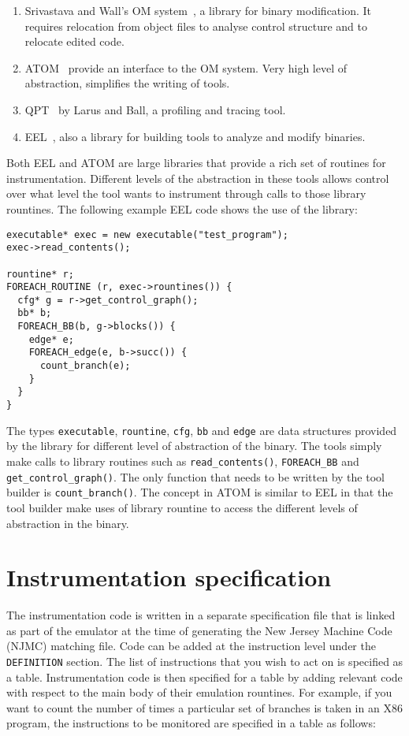 \begin{enumerate}
\item Srivastava and Wall's OM system~\cite{Dec94}, a library for binary 
	modification.  It requires relocation from object files to analyse 
	control structure and to relocate edited code.
\item ATOM~\cite{Eust95} provide an interface to the OM system.  
	Very high level of abstraction, simplifies the writing of tools.
\item QPT~\cite{Laru94} by Larus and Ball, a profiling and tracing tool.
\item EEL~\cite{Laru95}, also a library for building tools to analyze and 
	modify binaries.
\end{enumerate}

Both EEL and ATOM are large libraries that provide a rich set of routines for 
instrumentation. 
Different levels of the abstraction in these tools allows control over what 
level the tool wants to instrument through calls to those library rountines.  
The following example EEL code shows the use of the library:

\begin{verbatim}
executable* exec = new executable("test_program");
exec->read_contents();

rountine* r;
FOREACH_ROUTINE (r, exec->rountines()) {
  cfg* g = r->get_control_graph();
  bb* b;
  FOREACH_BB(b, g->blocks()) {
    edge* e;
    FOREACH_edge(e, b->succ()) {
      count_branch(e);
    } 
  }
}
\end{verbatim}

The types \texttt{executable}, \texttt{rountine}, \texttt{cfg}, \texttt{bb} and 
\texttt{edge} are data structures provided by the library for different level of
abstraction of the binary.  The tools simply make calls to library routines 
such as \texttt{read\_contents()}, \texttt{FOREACH\_BB} and 
\texttt{get\_control\_graph()}.  The only function that 
needs to be written by the tool builder is \texttt{count\_branch()}.
The concept in ATOM is similar to EEL in that the tool builder make uses of 
library rountine to access the different levels of abstraction in the binary.


\section{Instrumentation specification}

The instrumentation code is written in a separate specification file that is 
linked as part of the emulator at the time of generating the New Jersey 
Machine Code (NJMC) matching file.
Code can be added at the instruction level under the \texttt{DEFINITION} 
section.  
The list of instructions that you wish to act on is specified as a table.  
Instrumentation code is then specified for a table by adding relevant code with
respect to the main body of their emulation rountines.
For example, if you want to count the number of times a particular set of 
branches is taken in an X86 program, the instructions to be monitored are 
specified in a table as follows:

